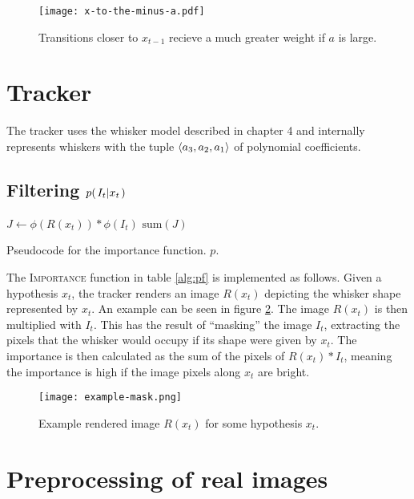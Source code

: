 \begin{figure}[ht]
  \centering
  \texttt{[image: x-to-the-minus-a.pdf]}
  \caption{Transitions closer to $x_{t-1}$ recieve a much greater
    weight if $a$ is large.}
  \label{fig:x-to-the-minus-a}
\end{figure}

\section{Tracker}

The tracker uses the whisker model described in chapter 4 and
internally represents whiskers with the tuple $\langle a_3, a_2, a_1 \rangle$ of polynomial
coefficients.

\subsection{Filtering $p{(\left. I_t \middle\vert x_t \right.)}$}
\label{sec:filtering}

\begin{table}[h]
  \begin{codebox}
    \li $ J \gets \phi(R(x_t)) * \phi(I_t)$
    \li \Return $\mathrm{sum}(J)$
  \end{codebox}
  \caption{Pseudocode for the importance function. $p$.}
  \label{alg:importance}
\end{table}

The \textsc{Importance} function in table \ref{alg:pf} is implemented
as follows. Given a hypothesis $x_t$, the tracker renders an image
$R(x_t)$ depicting the whisker shape represented by $x_t$. An example
can be seen in figure \ref{fig:example-mask}. The image $R(x_t)$ is
then multiplied with $I_t$. This has the result of ``masking'' the
image $I_t$, extracting the pixels that the whisker would occupy if
its shape were given by $x_t$. The importance is then calculated as
the sum of the pixels of $R(x_t) * I_t$, meaning the importance is
high if the image pixels along $x_t$ are bright.

\begin{figure}[h]
  \centering
  \texttt{[image: example-mask.png]}
  \caption{Example rendered image $R(x_t)$ for some hypothesis $x_t$.}
  \label{fig:example-mask}
\end{figure}

\section{Preprocessing of real images}
\label{prep-real}

